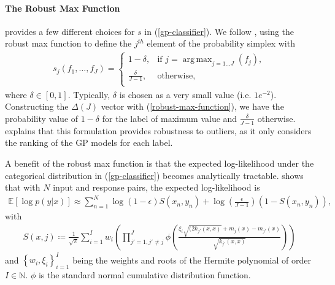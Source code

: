 \documentclass{article}
\DeclareMathOperator*{\argmax}{arg\,max}
\numberwithin{equation}{section}
\begin{document}
\paragraph{The Robust Max Function}\cite{matthews2017scalable} provides a few different choices for $s$ in (\ref{gp-classifier}). We follow \cite{wild2022generalized}, using the robust max function to define the $j^{th}$ element of the probability simplex with
\begin{align}
s_{j}\left(f_1, \dots, f_J\right) = \begin{cases}
      1-\delta, &  \text{if } j = \argmax_{j=1\dots J}\left(f_j\right), \\
      \frac{\delta}{J-1}, & \text{otherwise}, \\
   \end{cases}
   \label{robust-max-function}
\end{align}
where $\delta \in [0, 1]$. 
Typically, $\delta$ is chosen as a very small value (i.e. $1e^{-2}$). 
Constructing the $\Delta(J)$ vector with (\ref{robust-max-function}), we have the probability value of $1-\delta$ for the label of maximum value and $\frac{\delta}{J-1}$ otherwise. 
\cite{wild2022generalized} explains that this formulation provides robustness to outliers, as it only considers the ranking of the GP models for each label.

A benefit of the robust max function is that the expected log-likelihood under the categorical distribution in (\ref{gp-classifier}) becomes analytically tractable. \cite{wild2022generalized} shows that with $N$ input and response pairs, the expected log-likelihood is
\begin{align}
    \mathbb{E} \left[\log p\left(y \vert x\right)\right] \approx \sum_{n=1}^N \log(1-\epsilon) S(x_n, y_n) + \log\left(\frac{\epsilon}{J-1}\right) \left(1-S(x_n, y_n)\right),
    \label{robust-max-function-expected-log-likelihood}
\end{align}
with
\begin{align}
    S(x, j) \coloneqq \frac{1}{\sqrt{\pi}}\sum_{i=1}^{I} w_i \left(\prod_{j'=1, j'\neq j}^J \phi\left(\frac{\xi_i\sqrt{(2 k_{j'}(x, x)}+m_j(x) - m_{j'}(x)}{\sqrt{k_{j'}(x, x)}}\right)\right)
\end{align}
and $\left\{w_i, \xi_i\right\}_{i=1}^I$ being the weights and roots of the Hermite polynomial of order $I \in \mathbb{N}$. $\phi$ is the standard normal cumulative distribution function.

\newpage
\end{document}
